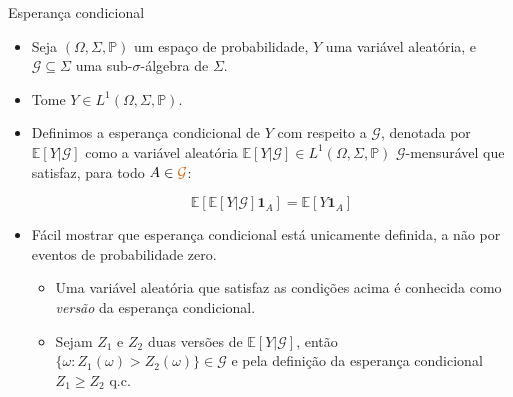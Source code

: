 \documentclass[11pt]{beamer}
\begin{document}
	\begin{frame}{Esperança condicional}
	\begin{itemize}
		\item Seja $(\Omega, \Sigma,\mathbb{P})$ um espaço de probabilidade, $Y$ uma variável aleatória, e $\mathcal{G}\subseteq \Sigma$ uma sub-$\sigma$-álgebra de $\Sigma$.
		\item Tome $Y \in L^1(\Omega, \Sigma,\mathbb{P})$.
		\item Definimos a esperança condicional de $Y$ com respeito a $\mathcal{G}$, denotada por $\mathbb{E}[Y|\mathcal{G}]$ como a {\color{blue}variável aleatória} $\mathbb{E}[Y|\mathcal{G}] \in L^1(\Omega, \Sigma,\mathbb{P})$ {\color{red}$\mathcal{G}$-mensurável} que satisfaz, para todo $A \in {\color{red}\mathcal{G}}$:
		
		$$\mathbb{E}[\mathbb{E}[Y|\mathcal{G}]\mathbf{1}_A] = \mathbb{E}[Y\mathbf{1}_A]$$
		\item Fácil mostrar que esperança condicional está unicamente definida, a não por eventos de probabilidade zero.
		\begin{itemize}
			\item Uma variável aleatória que satisfaz as condições acima é conhecida como \emph{versão} da esperança condicional.
			\item Sejam $Z_1$ e $Z_2$ duas versões de $\mathbb{E}[Y|\mathcal{G}]$, então $\{\omega: Z_1(\omega)>Z_2(\omega)\} \in \mathcal{G}$ e pela definição da esperança condicional $Z_1\geq Z_2$ q.c.
		\end{itemize}
	\end{itemize}
	\end{frame}
\end{document}
